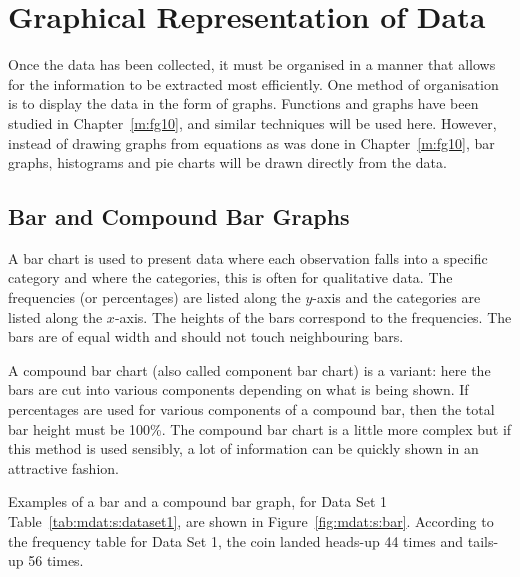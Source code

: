 \documentclass[10pt,a4paper,titlepage,twoside,openright]{report}
\begin{document}
\section{Graphical Representation of Data}

Once the data has been collected, it must be organised in a manner that allows for the information to be extracted most efficiently. One method of organisation is to display the data in the form of graphs. Functions and graphs have been studied in Chapter~\ref{m:fg10}, and similar techniques will be used here. However, instead of drawing graphs from equations as was done in Chapter~\ref{m:fg10}, bar graphs, histograms and pie charts will be drawn directly from the data.

\subsection{Bar and Compound Bar Graphs}
A bar chart is used to present data where each observation falls into a specific category and where the categories, this is often for qualitative data. The frequencies (or percentages) are listed along the $y$-axis and the categories are listed along the $x$-axis. The heights of the bars correspond to the frequencies. The bars are of equal width and should not touch neighbouring bars.

A compound bar chart (also called component bar chart) is a variant: here the bars are cut into various components depending on what is being shown. If percentages are used for various components of a compound bar, then the total bar height must be 100\%. The compound bar chart is a little more complex but if this method is used sensibly, a lot of information can be quickly shown in an attractive fashion.

Examples of a bar and a compound bar graph, for Data Set 1 Table~\ref{tab:mdat:s:dataset1}, are shown in Figure~\ref{fig:mdat:s:bar}. According to the frequency table for Data Set 1, the coin landed heads-up 44 times and tails-up 56 times.
\end{document}
